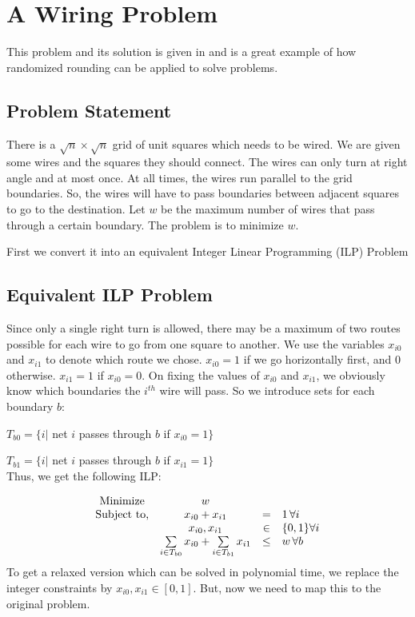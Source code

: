 
\section{A Wiring Problem}
This problem and its solution is given in \cite{random} and is a great example of how randomized rounding can be applied to solve problems.
\subsection{Problem Statement}
There is a $\sqrt{n} \times \sqrt{n}$ grid of unit squares which needs to be wired. We are given some wires and the squares they should connect. The wires can only turn at right angle and at most once. At all times, the wires run parallel to the grid boundaries. So, the wires will have to pass boundaries between adjacent squares to go to the destination. Let $w$ be the maximum number of wires that pass through a certain boundary. The problem is to minimize $w$.

First we convert it into an equivalent Integer Linear Programming (ILP) Problem
\subsection{Equivalent ILP Problem}
Since only a single right turn is allowed, there may be a maximum of two routes possible for each wire to go from one square to another. We use the variables $x_{i0} $ and $x_{i1}$ to denote which route we chose. $x_{i0} = 1$ if we go horizontally first, and $0$ otherwise. $x_{i1} = 1 $ if $x_{i0} = 0$. On fixing the values of $x_{i0}$ and $x_{i1}$, we obviously know which boundaries the $i^{th}$ wire will pass. So we introduce sets for each boundary $b$:

$ T_{b0} = \{i |$ net $i$ passes through $b$ if $x_{i0} = 1 \} $

$ T_{b1} = \{i |$ net $i$ passes through $b$ if $x_{i1} = 1 \}$ \\


Thus, we get the following ILP:

\[
\begin{array}{cccl}
$Minimize$ & w & & \\
$Subject to,$ & x_{i0}  + x_{i1} & = & 1 \,  \forall i\\
 &			x_{i0} , x_{i1} & \in & \{0,1\} \forall i \\
 &			\sum\limits_{i \in T_{b0}} x_{i0} + \sum\limits_{i \in T_{b1}} x_{i1} & \leq & w \, \forall b \\

\end{array}
\]
To get a relaxed version which can be solved in polynomial time, we replace the integer constraints by $x_{i0},x_{i1} \in [0,1]$. But, now we need to map this to the original problem.

